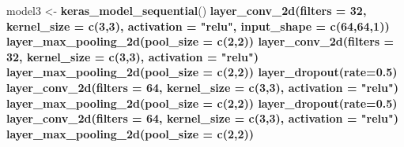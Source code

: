 \documentclass[12pt]{article}
\newenvironment{Shaded}{\begin{snugshade}}{\end{snugshade}}
\newcommand{\DataTypeTok}[1]{\textcolor[rgb]{0.13,0.29,0.53}{#1}}
\newcommand{\DecValTok}[1]{\textcolor[rgb]{0.00,0.00,0.81}{#1}}
\newcommand{\FloatTok}[1]{\textcolor[rgb]{0.00,0.00,0.81}{#1}}
\newcommand{\KeywordTok}[1]{\textcolor[rgb]{0.13,0.29,0.53}{\textbf{#1}}}
\newcommand{\NormalTok}[1]{#1}
\newcommand{\OperatorTok}[1]{\textcolor[rgb]{0.81,0.36,0.00}{\textbf{#1}}}
\newcommand{\StringTok}[1]{\textcolor[rgb]{0.31,0.60,0.02}{#1}}
\begin{document}
\begin{Shaded}
\begin{Highlighting}[]
\NormalTok{model3 <-}\StringTok{ }\KeywordTok{keras_model_sequential}\NormalTok{() }\OperatorTok{%
\StringTok{  }\KeywordTok{layer_conv_2d}\NormalTok{(}\DataTypeTok{filters =} \DecValTok{32}\NormalTok{, }\DataTypeTok{kernel_size =} \KeywordTok{c}\NormalTok{(}\DecValTok{3}\NormalTok{,}\DecValTok{3}\NormalTok{), }\DataTypeTok{activation =} \StringTok{"relu"}\NormalTok{, }
                \DataTypeTok{input_shape =} \KeywordTok{c}\NormalTok{(}\DecValTok{64}\NormalTok{,}\DecValTok{64}\NormalTok{,}\DecValTok{1}\NormalTok{)) }\OperatorTok{%
\StringTok{  }\KeywordTok{layer_max_pooling_2d}\NormalTok{(}\DataTypeTok{pool_size =} \KeywordTok{c}\NormalTok{(}\DecValTok{2}\NormalTok{,}\DecValTok{2}\NormalTok{)) }\OperatorTok{%
\StringTok{  }
\StringTok{  }\KeywordTok{layer_conv_2d}\NormalTok{(}\DataTypeTok{filters =} \DecValTok{32}\NormalTok{, }\DataTypeTok{kernel_size =} \KeywordTok{c}\NormalTok{(}\DecValTok{3}\NormalTok{,}\DecValTok{3}\NormalTok{), }\DataTypeTok{activation =} \StringTok{"relu"}\NormalTok{) }\OperatorTok{%
\StringTok{  }\KeywordTok{layer_max_pooling_2d}\NormalTok{(}\DataTypeTok{pool_size =} \KeywordTok{c}\NormalTok{(}\DecValTok{2}\NormalTok{,}\DecValTok{2}\NormalTok{)) }\OperatorTok{%
\StringTok{  }\KeywordTok{layer_dropout}\NormalTok{(}\DataTypeTok{rate=}\FloatTok{0.5}\NormalTok{) }\OperatorTok{%
\StringTok{  }
\StringTok{  }\KeywordTok{layer_conv_2d}\NormalTok{(}\DataTypeTok{filters =} \DecValTok{64}\NormalTok{, }\DataTypeTok{kernel_size =} \KeywordTok{c}\NormalTok{(}\DecValTok{3}\NormalTok{,}\DecValTok{3}\NormalTok{), }\DataTypeTok{activation =} \StringTok{"relu"}\NormalTok{) }\OperatorTok{%
\StringTok{  }\KeywordTok{layer_max_pooling_2d}\NormalTok{(}\DataTypeTok{pool_size =} \KeywordTok{c}\NormalTok{(}\DecValTok{2}\NormalTok{,}\DecValTok{2}\NormalTok{)) }\OperatorTok{%
\StringTok{  }\KeywordTok{layer_dropout}\NormalTok{(}\DataTypeTok{rate=}\FloatTok{0.5}\NormalTok{) }\OperatorTok{%
\StringTok{  }
\StringTok{  }\KeywordTok{layer_conv_2d}\NormalTok{(}\DataTypeTok{filters =} \DecValTok{64}\NormalTok{, }\DataTypeTok{kernel_size =} \KeywordTok{c}\NormalTok{(}\DecValTok{3}\NormalTok{,}\DecValTok{3}\NormalTok{), }\DataTypeTok{activation =} \StringTok{"relu"}\NormalTok{) }\OperatorTok{%
\StringTok{  }\KeywordTok{layer_max_pooling_2d}\NormalTok{(}\DataTypeTok{pool_size =} \KeywordTok{c}\NormalTok{(}\DecValTok{2}\NormalTok{,}\DecValTok{2}\NormalTok{)) }\OperatorTok{%
}}}}}}}}}}}
\end{Highlighting}
\end{Shaded}
\end{document}
